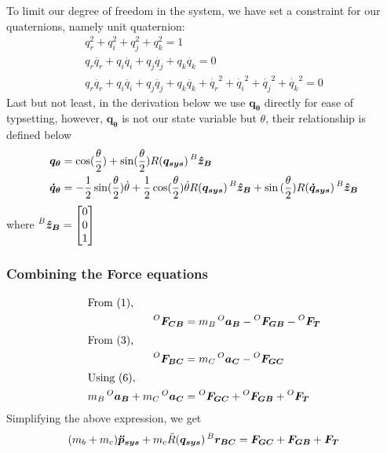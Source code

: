 To limit our degree of freedom in the system, we have set a constraint for our quaternions, namely unit quaternion:
\begin{align}
  q_r^2 + q_i^2 + q_j^2 + q_k^2 = 1 \\
  q_r\dot{q_r} + q_i\dot{q_i} + q_j\dot{q_j} + q_k\dot{q_k} = 0\\
  q_r\ddot{q_r} + q_i\ddot{q_i} + q_j\ddot{q_j} + q_k\ddot{q_k} + \dot{q_r}^2 + \dot{q_i}^2 + \dot{q_j}^2 + \dot{q_k}^2 = 0
\end{align}
Last but not least, in the derivation below we use $\bm{q_\theta}$ directly for ease of typsetting, however, $\bm{q_{\theta}}$ is not our state variable but $\theta$, their relationship is defined below
\begin{align}
  \bm{q_\theta} &= \cos(\frac{\theta}{2}) + \sin(\frac{\theta}{2})R(\bm{q_{sys}})\prescript{B}{}{\bm{\hat{z}_B}} \\
  \bm{\dot{q}_\theta} &= -\frac{1}{2}\sin(\frac{\theta}{2})\dot{\theta} + \frac{1}{2}\cos(\frac{\theta}{2})\dot{\theta}R(\bm{q_{sys}})\prescript{B}{}{\bm{\hat{z}_B}} + \sin{(\frac{\theta}{2})}R(\bm{\dot{q}_{sys}}) \prescript{B}{}{\bm{\hat{z}_B}}
\end{align}
where $\prescript{B}{}{\bm{\hat{z}_B}} =
\begin{bmatrix}
    0\\ 0\\ 1
\end{bmatrix}
$
\subsubsection{Combining the Force equations}
\begin{align*}
  \shortintertext{From (1),}
  \prescript{O}{}{\bm{F_{CB}}} &= m_B \prescript{O}{}{\bm{a_B}} - \prescript{O}{}{\bm{F_{GB}}} - \prescript{O}{}{\bm{F_{T}}} \\
  \shortintertext{From (3),}
  \prescript{O}{}{\bm{F_{BC}}} &= m_C \prescript{O}{}{\bm{a_C}} - \prescript{O}{}{\bm{F_{GC}}} \\
  \shortintertext{Using (6),}
  m_B \prescript{O}{}{\bm{a_B}} + m_C \prescript{O}{}{\bm{a_C}} &= \prescript{O}{}{\bm{F_{GC}}} + \prescript{O}{}{\bm{F_{GB}}} + \prescript{O}{}{\bm{F_{T}}} 
\end{align*}
Simplifying the above expression, we get
\begin{equation}
    (m_b + m_c) \bm{\ddot{p}_{sys}} + m_c \ddot{R}(\bm{q_{sys}}) \prescript{B}{}{\bm{r_{BC}}} = \bm{F_{GC}} + \bm{F_{GB}} + \bm{F_{T}} 
\end{equation}
